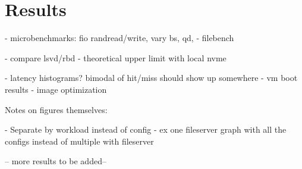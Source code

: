 \section{Results} \label{sec:results}

- microbenchmarks: fio randread/write, vary bs, qd,
- filebench

- compare lsvd/rbd
- theoretical upper limit with local nvme

- latency histograms? bimodal of hit/miss should show up somewhere
- vm boot results
- image optimization

Notes on figures themselves:

- Separate by workload instead of config
- ex one fileserver graph with all the configs instead of multiple with fileserver


-- more results to be added--







